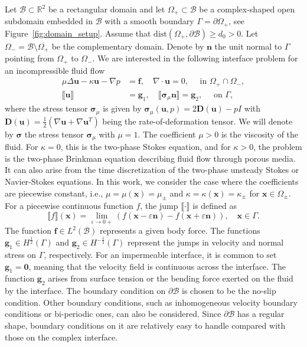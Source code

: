 \documentclass[preprint,11pt]{elsarticle}
\theoremstyle{remark}
\newcommand{\jump}[1]{\llbracket#1\rrbracket}
\newcommand{\grad}[1]{\nabla #1}
\newcommand{\mc}[1]{\mathcal{#1}}
\newcommand{\bm}[1]{\boldsymbol{#1}}
\newcommand{\R}{\mathbb{R}}
\begin{document}
Let $\mathcal{B}\subset \R^2$ be a rectangular domain and let $\Omega_+ \subset \mathcal{B}$ be a complex-shaped open subdomain embedded in $\mc B$ with a smooth boundary $\Gamma = \partial\Omega_+$, see Figure~\ref{fig:domain_setup}. Assume that $\text{dist}(\Omega_+, \partial\mathcal{B}) \geq d_0 > 0$. Let $\Omega_- = \mathcal{B}\setminus\overline{\Omega_+}$ be the complementary domain. Denote by $\bm n$ the unit normal to $\Gamma$ pointing from $\Omega_+$ to $\Omega_-$.
We are interested in the following interface problem for an incompressible fluid flow
\begin{subequations}\label{eqn:stokes-ip}
\begin{align}
    \mu \Delta \bm u - \kappa \bm u - \grad p &= \bm f, \quad \grad\cdot \bm u = 0, \quad \text{ in } \Omega_+ \cap \Omega_-, \\
    \jump{ \bm u } &= \bm g_1,\quad  \jump{\bm\sigma_\mu \bm n} = \bm g_2 , \quad\text{ on }\Gamma,
\end{align}
\end{subequations}
where the stress tensor $\bm \sigma_\mu$ is given by $\bm \sigma_\mu(\bm u, p) = 2\bm D(\bm u)- p  I $ with $\bm D(\bm u) = \frac{1}{2}(\grad \bm u + \grad \bm u^T) $ being the rate-of-deformation tensor. We will denote by $\bm \sigma$ the stress tensor $\bm\sigma_\mu$ with $\mu = 1$.
The coefficient $\mu > 0$ is the viscosity of the fluid.
For $\kappa=0$, this is the two-phase Stokes equation, and for $\kappa > 0$, the problem is the two-phase Brinkman equation describing fluid flow through porous media. It can also arise from the time discretization of the two-phase unsteady Stokes or Navier-Stokes equations.
In this work, we consider the case where the coefficients are piecewise constant, i.e., $\mu=\mu(\bm x)=\mu_\pm$ and $\kappa=\kappa(\bm x)=\kappa_\pm$ for $\bm x\in \Omega_\pm$.
For a piecewise continuous function $f$, the jump $\jump{\cdot}$ is defined as
\begin{equation}
    \jump{f}(\bm x) = \lim_{\varepsilon\to 0+} (f(\bm x - \varepsilon\bm n) - f(\bm x + \varepsilon \bm n)), \quad \bm x \in \Gamma.
\end{equation}
The function $\bm f\in L^2(\mc B)$ represents a given body force.
The functions $\bm g_1 \in H^{\frac{1}{2}}(\Gamma)$ and $\bm g_2\in H^{-\frac{1}{2}}(\Gamma)$ represent the jumps in velocity and normal stress on $\Gamma$, respectively. For an impermeable interface, it is common to set $\bm g_1 = \bm 0$, meaning that the velocity field is continuous across the interface. The function $\bm g_2$ arises from surface tension or the bending force exerted on the fluid by the interface. The boundary condition on $\partial\mathcal{B}$ is chosen to be the no-slip condition. Other boundary conditions, such as inhomogeneous velocity boundary conditions or bi-periodic ones, can also be considered. Since $\partial\mathcal{B}$ has a regular shape, boundary conditions on it are relatively easy to handle compared with those on the complex interface.
\end{document}
